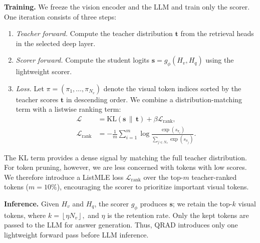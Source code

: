 \textbf{Training.}
We freeze the vision encoder and the LLM and train only the scorer. One iteration consists of three steps:
\begin{enumerate}
  \item \emph{Teacher forward.} Compute the teacher distribution ${\mathbf{t}}$ from the retrieval heads in the selected deep layer.
  \item \emph{Scorer forward.} Compute the student logits $\mathbf{s}=g_\phi(H_v,H_q)$ using the lightweight scorer.
  \item \emph{Loss.} Let $\pi=(\pi_1,\ldots,\pi_{N_v})$ denote the visual token indices sorted by the teacher scores ${\mathbf{t}}$ in descending order. We combine a distribution-matching term with a listwise ranking term:
  \begin{align}
  \mathcal{L}&=\mathrm{KL}({\mathbf{s}}\,\|\,\mathbf{t})
  +\beta\mathcal{L}_{\text{rank}}, \\
  \mathcal{L}_{\text{rank}}&=-\frac{1}{m}\sum_{i=1}^{m}
  \log\frac{\exp(s_{\pi_i})}{\sum\limits_{j\in N_v}\exp(s_{\pi_j})}.
  \label{eq:loss}
  \end{align}
\end{enumerate}
The KL term provides a dense signal by matching the full teacher distribution. For token pruning, however, we are less concerned with tokens with low scores. We therefore introduce a ListMLE loss $\mathcal{L}_{\text{rank}}$ over the top-$m$ teacher-ranked tokens ($m=10\%$), encouraging the scorer to prioritize important visual tokens.

\textbf{Inference.}
Given $H_v$ and $H_q$, the scorer $g_\phi$ produces $\mathbf{s}$; we retain the top-$k$ visual tokens, where $k=\left\lfloor \eta N_v\right\rfloor,$ and $\eta$ is the retention rate. Only the kept tokens are passed to the LLM for answer generation. Thus, QRAD introduces only one lightweight forward pass before LLM inference.
